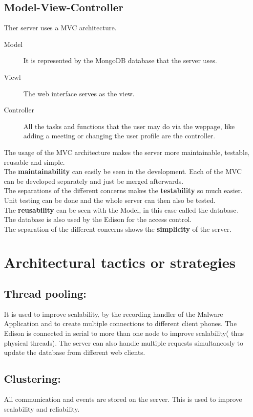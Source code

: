 \documentclass[a4paper,12pt,titlepage]{article}
\begin{document}
\subsection{Model-View-Controller}
Ther server uses a MVC architecture.
\begin{description}
\item[Model] It is represented by the MongoDB database that the server uses.
\item[Viewl] The web interface serves as the view.
\item[Controller] All the tasks and functions that the user may do via the weppage, like adding a meeting or changing the user profile are the controller.
\end{description}
The usage of the MVC architecture makes the server more maintainable, testable, reusable and simple.\\ 
 The \textbf{maintainability} can easily be seen in the development. Each of the MVC can be developed separately and just be merged afterwards.\\
The separations of the different concerns makes the \textbf{testability} so much easier. Unit testing can be done and the whole server can then also be tested.\\
The \textbf{reusability} can be seen with the Model, in this case called the database. The database is also used by the Edison for the access control.\\
 The separation of the different concerns shows the \textbf{simplicity} of the server. 





\newpage\section{Architectural tactics or strategies}
	\subsection{Thread pooling: }It is used to improve scalability, by the recording handler of the Malware Application and to create multiple connections to different client phones. The Edison is connected in serial to more than one node to improve scalability( thus physical threads). The server can also handle multiple requests simultaneosly to update the database from different web clients.
	\subsection{Clustering: } All communication and events are stored on the server. This is used to improve scalability and reliability. 
\end{document}
